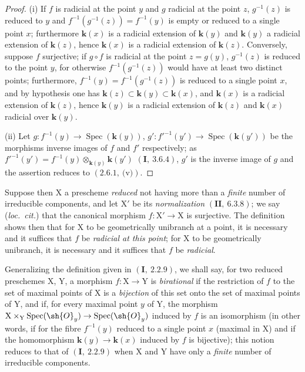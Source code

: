 \begin{proof}
(i) If $f$ is radicial at the point $y$ and $g$ radicial at the point $z$, $g^{-1}(z)$ is reduced to $y$ and
$f^{-1}(g^{-1}(z))=f^{-1}(y)$ is empty or reduced to a single point $x$; furthermore $\boldsymbol{k}(x)$ is a radicial extension
of $\boldsymbol{k}(y)$ and $\boldsymbol{k}(y)$ a radicial extension of $\boldsymbol{k}(z)$, hence $\boldsymbol{k}(x)$ is a radicial extension of $\boldsymbol{k}(z)$.
Conversely, suppose $f$ surjective; if $g\circ f$ is radicial at the point $z=g(y)$, $g^{-1}(z)$ is reduced
to the point $y$, for otherwise $f^{-1}(g^{-1}(z))$ would have at least two distinct points; furthermore,
$f^{-1}(y)=f^{-1}(g^{-1}(z))$ is reduced to a single point $x$, and by hypothesis one has $\boldsymbol{k}(z)\subset\boldsymbol{k}(y)\subset\boldsymbol{k}(x)$,
and $\boldsymbol{k}(x)$ is a radicial extension of $\boldsymbol{k}(z)$, hence $\boldsymbol{k}(y)$ is a radicial extension of $\boldsymbol{k}(z)$ and $\boldsymbol{k}(x)$ radicial over $\boldsymbol{k}(y)$.

(ii) Let $g:f^{-1}(y)\to\operatorname{Spec}(\boldsymbol{k}(y))$, $g':f'^{-1}(y')\to\operatorname{Spec}(\boldsymbol{k}(y'))$ be the morphisms
inverse images of $f$ and $f'$ respectively; as $f'^{-1}(y')=f^{-1}(y)\otimes_{\boldsymbol{k}(y)}\boldsymbol{k}(y')$
$(\mathbf{I},~3.6.4)$, $g'$ is the inverse image of $g$ and the assertion reduces to $(2.6.1,~\text{(v)})$.
\end{proof}

Suppose then $\mathrm{X}$ a prescheme \emph{reduced} not having more than a \emph{finite} number of irreducible components,
and let $\mathrm{X}'$ be its \emph{normalization} $(\mathbf{II},~6.3.8)$; we say (\emph{loc.~cit.}) that the canonical morphism
$f:\mathrm{X}'\to\mathrm{X}$ is surjective. The definition  shows then that for $\mathrm{X}$ to be geometrically
unibranch at a point, it is necessary and it suffices that $f$ be \emph{radicial at this point}; for
$\mathrm{X}$ to be geometrically unibranch, it is necessary and it suffices that $f$ be \emph{radicial}.

\begin{env}[6.15.4]
\label{IV.6.15.4}
Generalizing the definition given in $(\mathbf{I},~2.2.9)$, we shall say,
for two reduced preschemes $\mathrm{X}$, $\mathrm{Y}$, a morphism $f:\mathrm{X}\to\mathrm{Y}$ is \emph{birational} if the restriction
of $f$ to the set of maximal points of $\mathrm{X}$ is a \emph{bijection} of this set onto
the set of maximal points of $\mathrm{Y}$, and if, for every maximal point $y$ of $\mathrm{Y}$, the
morphism $\mathrm{X}\times_\mathrm{Y}\operatorname{Spec}(\sh{O}_y)\to\operatorname{Spec}(\sh{O}_y)$ induced by $f$ is an isomorphism (in other words,
if for the fibre $f^{-1}(y)$ reduced to a single point $x$ (maximal in $\mathrm{X}$) and if the homomorphism
$\boldsymbol{k}(y)\to\boldsymbol{k}(x)$ induced by $f$ is bijective); this notion reduces to that of $(\mathbf{I},~2.2.9)$ when $\mathrm{X}$
and $\mathrm{Y}$ have only a \emph{finite} number of irreducible components.
\end{env}


